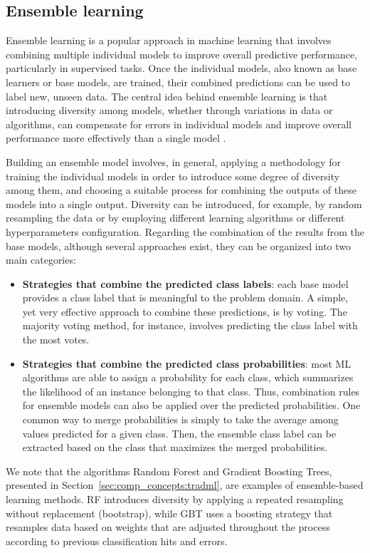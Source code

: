 \subsection{Ensemble learning}
\label{sec:comp_concepts:ensemble}

Ensemble learning is a popular approach in machine learning that involves combining multiple individual models to improve overall predictive performance, particularly in supervised tasks. Once the individual models, also known as base learners or base models, are trained, their combined predictions can be used to label new, unseen data. The central idea behind ensemble learning is that introducing diversity among models, whether through variations in data or algorithms, can compensate for errors in individual models and improve overall performance more effectively than a single model \cite{sagi2018ensemble, dong2020survey}.

Building an ensemble model involves, in general, applying a methodology for training the individual models in order to introduce some degree of diversity among them, and choosing a suitable process for combining the outputs of these models into a single output. Diversity can be introduced, for example, by random resampling the data or by employing different learning algorithms or different hyperparameters configuration. Regarding the combination of the results from the base models, although several approaches exist, they can be organized into two main categories:

\begin{itemize}

    \item \textbf{Strategies that combine the predicted class labels}: each base model provides a class label that is meaningful to the problem domain. A simple, yet very effective approach to combine these predictions, is by voting. The majority voting method, for instance, involves predicting the class label with the most votes. 
    
    \item \textbf{Strategies that combine the predicted class probabilities}: most ML algorithms are able to assign a probability for each class, which summarizes the likelihood of an instance belonging to that class. Thus, combination rules for ensemble models can also be applied over the predicted probabilities. One common way to merge probabilities is simply to take the average among values predicted for a given class. Then, the ensemble class label can be extracted based on the class that maximizes the merged probabilities.
    
\end{itemize}
We note that the algorithms Random Forest and Gradient Boosting Trees, presented in Section~\ref{sec:comp_concepts:tradml}, are examples of ensemble-based learning methods. RF introduces diversity by applying a repeated resampling without replacement (\ie bootstrap), while GBT uses a boosting strategy that resamples data based on weights that are adjusted throughout the process according to previous classification hits and errors.




